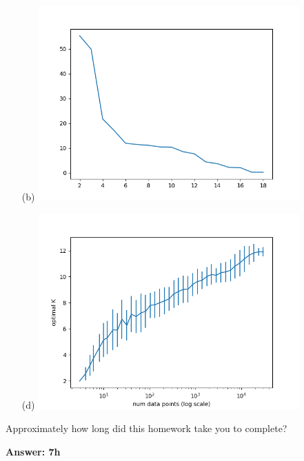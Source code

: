 \documentclass[submit]{harvardml}
\begin{document}
\begin{itemize}
\item[(b)]
    \includegraphics[width=10cm]{p3_part_b.png}
\item[(d)]
    \includegraphics[width=10cm]{p3_part_d.png}
\end{itemize}


\newpage
\begin{problem}[Calibration, 1pt]
Approximately how long did this homework take you to complete?
\end{problem}
\textbf{Answer: 7h}
\end{document}
